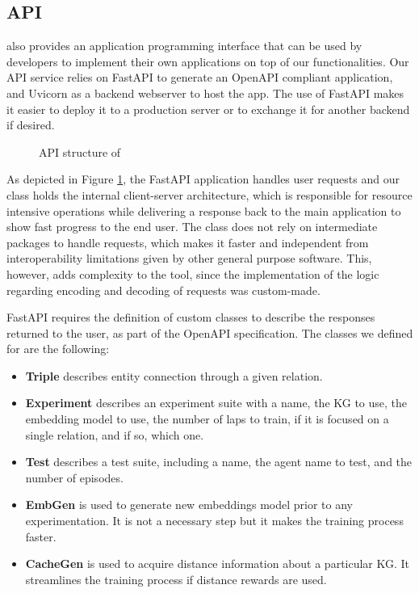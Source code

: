 
\subsection{API}
\toolname{} also provides an application programming interface that can be used by developers to implement their own applications on top of our functionalities. Our API service relies on FastAPI
to generate an OpenAPI
compliant application, and Uvicorn 
as a backend webserver to host the app. The use of FastAPI makes it easier to deploy it to a production server or to exchange it for another backend if desired.



\begin{figure}[!h]
    \centering
    
    \caption{API structure of \toolname{}}
    \label{fig:API_structure}
\end{figure}

As depicted in Figure \ref{fig:API_structure}, the FastAPI application handles user requests and our  class holds the internal client-server architecture, which is responsible for resource intensive operations while delivering a response back to the main application to show fast progress to the end user. The   class does not rely on intermediate packages to handle requests, which makes it faster and independent from interoperability limitations given by other general purpose software. This, however, adds complexity to the tool, since the implementation of the logic regarding encoding and decoding of requests was custom-made.

FastAPI requires the definition of custom classes to describe the responses returned to the user, as part of the OpenAPI specification. The classes we defined for \toolname{} are the following:

\begin{itemize}
    \item \textbf{Triple} describes entity connection through a given relation.
    \item \textbf{Experiment} describes an experiment suite with a name, the KG to use, the embedding model to use, the number of laps to train, if it is focused on a single relation, and if so, which one.
    \item \textbf{Test} describes a test suite, including a name, the agent name to test, and the number of episodes.
    \item \textbf{EmbGen} is used to generate new embeddings model prior to any experimentation. It is not a necessary step but it makes the training process faster.
    \item \textbf{CacheGen} is used to acquire distance information about a particular KG. It streamlines the training process if distance rewards are used.
\end{itemize}


